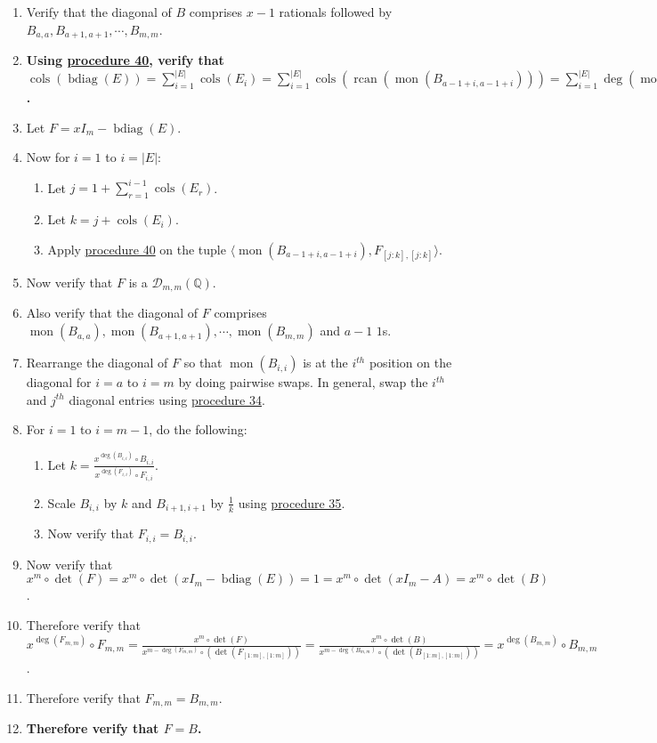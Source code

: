 \documentclass[twocolumn]{article}
\DeclareMathOperator{\bdiag}{bdiag}
\DeclareMathOperator{\rcan}{rcan}
\DeclareMathOperator{\mon}{mon}
\DeclareMathOperator{\cols}{cols}
\begin{document}
				\begin{enumerate}
					\item Verify that the diagonal of $B$ comprises $x-1$ rationals followed by $B_{a,a},B_{a+1,a+1},\cdots,B_{m,m}$.
					\item \textbf{Using \hyperref[sec:procedure 40]{procedure 40}, verify that $\cols(\bdiag(E))=\sum_{i=1}^{\lvert E\rvert}\cols(E_i)=\sum_{i=1}^{\lvert E\rvert}\cols(\rcan(\mon(B_{a-1+i,a-1+i})))=\sum_{i=1}^{\lvert E\rvert}\deg(\mon(B_{a-1+i,a-1+i}))=\sum_{i=1}^{m+1-a}\deg(B_{a-1+i,a-1+i})=\sum_{i=a}^m\deg(B_{i,i})=m$.}
					\item Let $F=xI_m-\bdiag(E)$.
					\item Now for $i=1$ to $i=\lvert E\rvert$:
					\begin{enumerate}
						\item Let $j=1+\sum_{r=1}^{i-1}\cols(E_r)$.
						\item Let $k=j+\cols(E_i)$.
						\item Apply \hyperref[sec:procedure 40]{procedure 40} on the tuple $\langle\mon(B_{a-1+i,a-1+i}),F_{[j:k],[j:k]}\rangle$.
					\end{enumerate}
					\item Now verify that $F$ is a $\mathcal{D}_{m,m}(\mathbb{Q})$.
					\item Also verify that the diagonal of $F$ comprises $\mon(B_{a,a}),\mon(B_{a+1,a+1}),\cdots,\mon(B_{m,m})$ and $a-1$ $1$s.
					\item Rearrange the diagonal of $F$ so that $\mon(B_{i,i})$ is at the $i^{th}$ position on the diagonal for $i=a$ to $i=m$ by doing pairwise swaps. In general, swap the $i^{th}$ and $j^{th}$ diagonal entries using \hyperref[sec:procedure 34]{procedure 34}.
					\item For $i=1$ to $i=m-1$, do the following:
					\begin{enumerate}
						\item Let $k=\frac{x^{\deg(B_{i,i})}\circ B_{i,i}}{x^{\deg(F_{i,i})}\circ F_{i,i}}$.
						\item Scale $B_{i,i}$ by $k$ and $B_{i+1,i+1}$ by $\frac{1}{k}$ using \hyperref[sec:procedure 35]{procedure 35}.
						\item Now verify that $F_{i,i}=B_{i,i}$.
					\end{enumerate}
					\item Now verify that $x^m\circ\det(F)=x^m\circ\det(xI_m-\bdiag(E))=1=x^m\circ\det(xI_m-A)=x^m\circ\det(B)$.
					\item Therefore verify that $x^{\deg(F_{m,m})}\circ F_{m,m}=\frac{x^m\circ\det(F)}{x^{m-\deg(F_{m,m})}\circ(\det(F_{[1:m],[1:m]}))}=\frac{x^m\circ\det(B)}{x^{m-\deg(B_{m,m})}\circ(\det(B_{[1:m],[1:m]}))}=x^{\deg(B_{m,m})}\circ B_{m,m}$.
					\item Therefore verify that $F_{m,m}=B_{m,m}$.
					\item \textbf{Therefore verify that $F=B$.}
				\end{enumerate}
\end{document}
